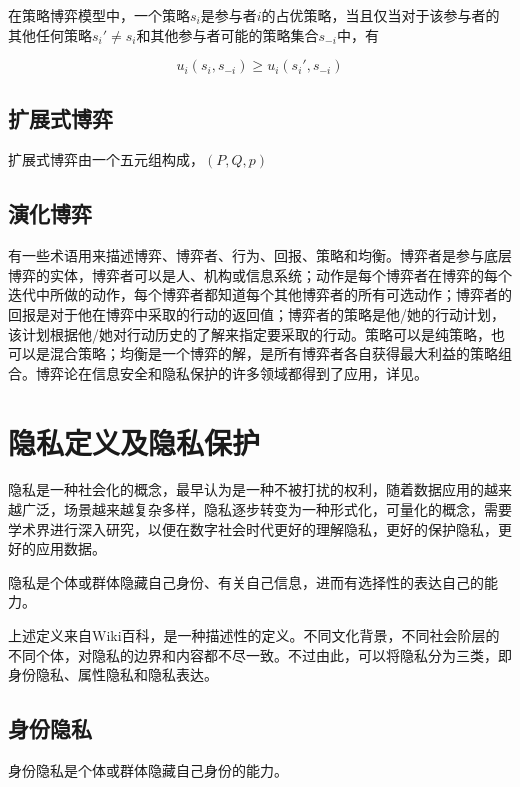 \begin{definition}
在策略博弈模型中，一个策略$s_i$是参与者$i$的占优策略，当且仅当对于该参与者的其他任何策略$s_i'\neq s_i$和其他参与者可能的策略集合$s_{-i}$中，有

\begin{equation}
	u_i(s_i,s_{-i}) \geq 	u_i(s_i',s_{-i})
\end{equation}
\end{definition}

\subsection{扩展式博弈}
扩展式博弈由一个五元组构成，$(P,Q,p)$
\subsection{演化博弈}



有一些术语用来描述博弈、博弈者、行为、回报、策略和均衡\cite{liang2013game}。博弈者是参与底层博弈的实体，博弈者可以是人、机构或信息系统；动作是每个博弈者在博弈的每个迭代中所做的动作，每个博弈者都知道每个其他博弈者的所有可选动作；博弈者的回报是对于他在博弈中采取的行动的返回值；博弈者的策略是他/她的行动计划，该计划根据他/她对行动历史的了解来指定要采取的行动。策略可以是纯策略，也可以是混合策略；均衡是一个博弈的解，是所有博弈者各自获得最大利益的策略组合。博弈论在信息安全和隐私保护的许多领域都得到了应用，详见\cite{liang2013game}。
\section{隐私定义及隐私保护}
隐私是一种社会化的概念，最早认为是一种不被打扰的权利，随着数据应用的越来越广泛，场景越来越复杂多样，隐私逐步转变为一种形式化，可量化的概念，需要学术界进行深入研究，以便在数字社会时代更好的理解隐私，更好的保护隐私，更好的应用数据。

\begin{definition}
	隐私是个体或群体隐藏自己身份、有关自己信息，进而有选择性的表达自己的能力。
\end{definition}

上述定义来自Wiki百科，是一种描述性的定义。不同文化背景，不同社会阶层的不同个体，对隐私的边界和内容都不尽一致。不过由此，可以将隐私分为三类，即身份隐私、属性隐私和隐私表达。

\subsection{身份隐私}
\begin{definition}
身份隐私是个体或群体隐藏自己身份的能力。
\end{definition}

